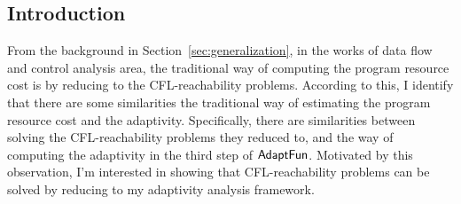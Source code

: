 \subsection{Introduction}
\label{subsec:cfl-backgroung}
From the background in Section~\ref{sec:generalization},
in the works of data flow and control analysis area,
the traditional way of computing the program resource cost is
by reducing to the CFL-reachability problems.
%
According to this, 
I identify 
that there are some similarities the traditional way of estimating the program resource cost and 
the adaptivity.
Specifically, there are similarities between solving the CFL-reachability problems they reduced to,
 and the way of computing the adaptivity in 
the third step of $\textsf{AdaptFun}$.
 Motivated by this observation, 
 I'm interested in showing that
 CFL-reachability problems can be solved by reducing to my adaptivity analysis framework.

